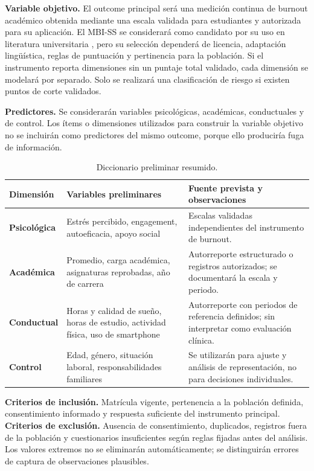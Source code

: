 \documentclass[11pt,a4paper]{article}
\begin{document}
\textbf{Variable objetivo.} El outcome principal será una medición continua de burnout académico obtenida mediante una escala validada para estudiantes y autorizada para su aplicación. El MBI-SS se considerará como candidato por su uso en literatura universitaria \cite{cuevas2025}, pero su selección dependerá de licencia, adaptación lingüística, reglas de puntuación y pertinencia para la población. Si el instrumento reporta dimensiones sin un puntaje total validado, cada dimensión se modelará por separado. Solo se realizará una clasificación de riesgo si existen puntos de corte validados.

\textbf{Predictores.} Se considerarán variables psicológicas, académicas, conductuales y de control. Los ítems o dimensiones utilizados para construir la variable objetivo no se incluirán como predictores del mismo outcome, porque ello produciría fuga de información.

\begin{table}[H]
\centering
\small
\caption{Diccionario preliminar resumido.}
\begin{tabularx}{\textwidth}{>{\bfseries}p{2.7cm}p{4.1cm}X}
\toprule
Dimensión & Variables preliminares & Fuente prevista y observaciones \\
\midrule
Psicológica & Estrés percibido, engagement, autoeficacia, apoyo social & Escalas validadas independientes del instrumento de burnout. \\
Académica & Promedio, carga académica, asignaturas reprobadas, año de carrera & Autorreporte estructurado o registros autorizados; se documentará la escala y periodo. \\
Conductual & Horas y calidad de sueño, horas de estudio, actividad física, uso de smartphone & Autorreporte con periodos de referencia definidos; sin interpretar como evaluación clínica. \\
Control & Edad, género, situación laboral, responsabilidades familiares & Se utilizarán para ajuste y análisis de representación, no para decisiones individuales. \\
\bottomrule
\end{tabularx}
\end{table}

\textbf{Criterios de inclusión.} Matrícula vigente, pertenencia a la población definida, consentimiento informado y respuesta suficiente del instrumento principal. \textbf{Criterios de exclusión.} Ausencia de consentimiento, duplicados, registros fuera de la población y cuestionarios insuficientes según reglas fijadas antes del análisis. Los valores extremos no se eliminarán automáticamente; se distinguirán errores de captura de observaciones plausibles.
\end{document}
